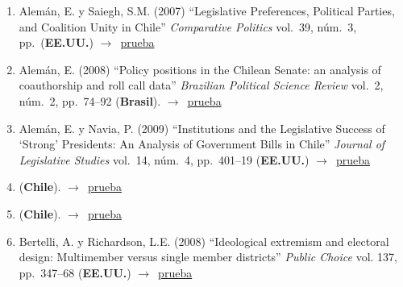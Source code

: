 \documentclass[12 pt, letter]{article}
\newenvironment{CitasMiTrabajo}{
    \begin{footnotesize}
    \begin{enumerate}[label={\footnotesize\emph{cita~\arabic*}},ref=\arabic*] %
        \setlength{\itemsep}{.1\itemsep}
        \setlength{\parskip}{.1\parskip}
    }{\end{enumerate}\end{footnotesize}}
\begin{document}
        \begin{CitasMiTrabajo}

        \item Alem\'an, E. y Saiegh, S.M. (2007)
        ``Legislative Preferences,
        Political Parties, and Coalition Unity in Chile'' \emph{Comparative
        Politics} vol.\ 39, n\'um.\ 3, pp.\ (\textbf{EE.UU.}) $\rightarrow$~\href{https://github.com/emagar/cv/blob/master/citasMiTrab/mrs/alemanSaiegh07.pdf}{prueba}

        \item Alem\'an, E. (2008)
        ``Policy positions in the Chilean Senate: an analysis of coauthorship and roll call data''
        \emph{Brazilian Political Science Review}
        vol.\ 2, n\'um.\ 2, pp.\ 74--92 (\textbf{Brasil}). $\rightarrow$~\href{https://github.com/emagar/cv/blob/master/citasMiTrab/mrs/alemanCosponsorChile2008brjps.excerpt.pdf}{prueba}

        \item Alem\'an, E. y Navia, P. (2009)
        ``Institutions and the Legislative Success of `Strong'
        Presidents: An Analysis of Government Bills in Chile''
        \emph{Journal of Legislative Studies}
        vol.\ 14, n\'um.\ 4, pp.\ 401--19 (\textbf{EE.UU.}) $\rightarrow$~\href{https://github.com/emagar/cv/blob/master/citasMiTrab/mrs/alemanNavia.pdf}{prueba}

        \item {} (\textbf{Chile}). $\rightarrow$~\href{https://www.redalyc.org/pdf/960/96040292002.pdf}{prueba}
        
        \item {} (\textbf{Chile}). $\rightarrow$~\href{https://journals.sagepub.com/doi/full/10.1177/1866802X1801000101}{prueba}
        
        \item Bertelli, A. y Richardson, L.E. (2008)
        ``Ideological extremism and electoral design: Multimember versus
        single member districts'' \emph{Public Choice} vol. 137, pp.\
        347--68  (\textbf{EE.UU.}) $\rightarrow$~\href{https://github.com/emagar/cv/blob/master/citasMiTrab/mrs/bertelli.pdf}{prueba}
        


\end{CitasMiTrabajo}
\end{document}

